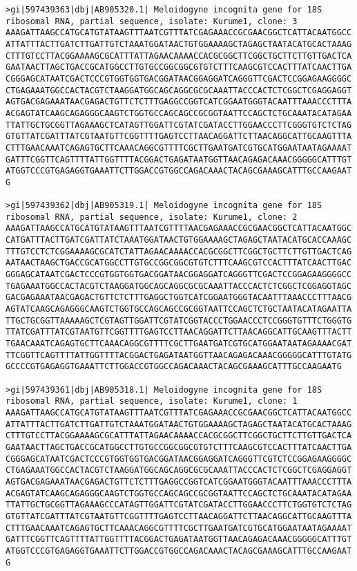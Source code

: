 \documentclass[11pt]{article}
\begin{document}
\begin{Verbatim}[commandchars=\\\{\}]
>gi|597439363|dbj|AB905320.1| Meloidogyne incognita gene for 18S ribosomal RNA, partial sequence, isolate: Kurume1, clone: 3
AAAGATTAAGCCATGCATGTATAAGTTTAATCGTTTATCGAGAAACCGCGAACGGCTCATTACAATGGCC
ATTATTTACTTGATCTTGATTGTCTAAATGGATAACTGTGGAAAAGCTAGAGCTAATACATGCACTAAAG
CTTTGTCCTTACGGAAAAGCGCATTTATTAGAACAAAACCACGCGGCTTCGGCTGCTTCTTGTTGACTCA
GAATAACTTAGCTGACCGCATGGCCTTGTGCCGGCGGCGTGTCTTTCAAGCGTCCACTTTATCAACTTGA
CGGGAGCATAATCGACTCCCGTGGTGGTGACGGATAACGGAGGATCAGGGTTCGACTCCGGAGAAGGGGC
CTGAGAAATGGCCACTACGTCTAAGGATGGCAGCAGGCGCGCAAATTACCCACTCTCGGCTCGAGGAGGT
AGTGACGAGAAATAACGAGACTGTTCTCTTTGAGGCCGGTCATCGGAATGGGTACAATTTAAACCCTTTA
ACGAGTATCAAGCAGAGGGCAAGTCTGGTGCCAGCAGCCGCGGTAATTCCAGCTCTGCAAATACATAGAA
TTATTGCTGCGGTTAGAAAGCTCATAGTTGGATTCGTATCGATACCTTGGAACCCTTCGGGTGTCTCTAG
GTGTTATCGATTTATCGTAATGTTCGGTTTTGAGTCCTTAACAGGATTCTTAACAGGCATTGCAAGTTTA
CTTTGAACAAATCAGAGTGCTTCAAACAGGCGTTTTCGCTTGAATGATCGTGCATGGAATAATAGAAAAT
GATTTCGGTTCAGTTTTATTGGTTTTACGGACTGAGATAATGGTTAACAGAGACAAACGGGGGCATTTGT
ATGGTCCCGTGAGAGGTGAAATTCTTGGACCGTGGCCAGACAAACTACAGCGAAAGCATTTGCCAAGAAT
G

>gi|597439362|dbj|AB905319.1| Meloidogyne incognita gene for 18S ribosomal RNA, partial sequence, isolate: Kurume1, clone: 2
AAAGATTAAGCCATGCATGTATAAGTTTAATCGTTTTAACGAGAAACCGCGAACGGCTCATTACAATGGC
CATGATTTACTTGATCGATTATCTAAATGGATAACTGTGGAAAAGCTAGAGCTAATACATGCACCAAAGC
TTTGTCCTCTCGGAAAAGCGCATCTATTAGAACAAAACCACGCGGCTTCGGCTGCTTCTTGTTGACTCAG
AATAACTAAGCTGACCGCATGGCCTTGTGCCGGCGGCGTGTCTTTCAAGCGTCCACTTTATCAACTTGAC
GGGAGCATAATCGACTCCCGTGGTGGTGACGGATAACGGAGGATCAGGGTTCGACTCCGGAGAAGGGGCC
TGAGAAATGGCCACTACGTCTAAGGATGGCAGCAGGCGCGCAAATTACCCACTCTCGGCTCGGAGGTAGC
GACGAGAAATAACGAGACTGTTCTCTTTGAGGCTGGTCATCGGAATGGGTACAATTTAAACCCTTTAACG
AGTATCAAGCAGAGGGCAAGTCTGGTGCCAGCAGCCGCGGTAATTCCAGCTCTGCTAATACATAGAATTA
TTGCTGCGGTTAAAAAGCTCGTAGTTGGATTCGTATCGGTACCCTGGAACCCTCCGGGTGTTTCTGGGTG
TTATCGATTTATCGTAATGTTCGGTTTTGAGTCCTTAACAGGATTCTTAACAGGCATTGCAAGTTTACTT
TGAACAAATCAGAGTGCTTCAAACAGGCGTTTTCGCTTGAATGATCGTGCATGGAATAATAGAAAACGAT
TTCGGTTCAGTTTTATTGGTTTTACGGACTGAGATAATGGTTAACAGAGACAAACGGGGGCATTTGTATG
GCCCCGTGAGAGGTGAAATTCTTGGACCGTGGCCAGACAAACTACAGCGAAAGCATTTGCCAAGAATG

>gi|597439361|dbj|AB905318.1| Meloidogyne incognita gene for 18S ribosomal RNA, partial sequence, isolate: Kurume1, clone: 1
AAAGATTAAGCCATGCATGTATAAGTTTAATCGTTTATCGAGAAACCGCGAACGGCTCATTACAATGGCC
ATTATTTACTTGATCTTGATTGTCTAAATGGATAACTGTGGAAAAGCTAGAGCTAATACATGCACTAAAG
CTTTGTCCTTACGGAAAAGCGCATTTATTAGAACAAAACCACGCGGCTTCGGCTGCTTCTTGTTGACTCA
GAATAACTTAGCTGACCGCATGGCCTTGTGCCGGCGGCGTGTCTTTCAAGCGTCCACTTTATCAACTTGA
CGGGAGCATAATCGACTCCCGTGGTGGTGACGGATAACGGAGGATCAGGGTTCGTCTCCGGAGAAGGGGC
CTGAGAAATGGCCACTACGTCTAAGGATGGCAGCAGGCGCGCAAATTACCCACTCTCGGCTCGAGGAGGT
AGTGACGAGAAATAACGAGACTGTTCTCTTTGAGGCCGGTCATCGGAATGGGTACAATTTAAACCCTTTA
ACGAGTATCAAGCAGAGGGCAAGTCTGGTGCCAGCAGCCGCGGTAATTCCAGCTCTGCAAATACATAGAA
TTATTGCTGCGGTTAGAAAGCCCATAGTTGGATTCGTATCGATACCTTGGAACCCTTCTGGTGTCTCTAG
GTGTTATCGATTTATCGTAATGTTCGGTTTTGAGTCCTTAACAGGATTCTTAACAGGCATTGCAAGTTTA
CTTTGAACAAATCAGAGTGCTTCAAACAGGCGTTTTCGCTTGAATGATCGTGCATGGAATAATAGAAAAT
GATTTCGGTTCAGTTTTATTGGTTTTACGGACTGAGATAATGGTTAACAGAGACAAACGGGGGCATTTGT
ATGGTCCCGTGAGAGGTGAAATTCTTGGACCGTGGCCAGACAAACTACAGCGAAAGCATTTGCCAAGAAT
G


\end{Verbatim}
\end{document}
